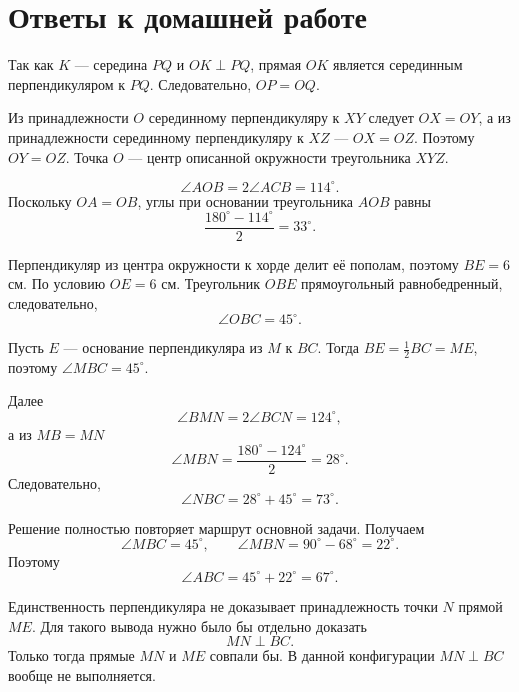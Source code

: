 \newpage
\section{Ответы к домашней работе}

\begin{answerbox}[Задание 1]
Так как \(K\) — середина \(PQ\) и \(OK\perp PQ\), прямая \(OK\) является
серединным перпендикуляром к \(PQ\). Следовательно, \(OP=OQ\).
\end{answerbox}

\begin{answerbox}[Задание 2]
Из принадлежности \(O\) серединному перпендикуляру к \(XY\) следует
\(OX=OY\), а из принадлежности серединному перпендикуляру к \(XZ\) —
\(OX=OZ\). Поэтому \(OY=OZ\). Точка \(O\) — центр описанной окружности
треугольника \(XYZ\).
\end{answerbox}

\begin{answerbox}[Задание 3]
\[
\angle AOB=2\angle ACB=114^\circ.
\]
Поскольку \(OA=OB\), углы при основании треугольника \(AOB\) равны
\[
\frac{180^\circ-114^\circ}{2}=33^\circ.
\]
\end{answerbox}

\begin{answerbox}[Задание 4]
Перпендикуляр из центра окружности к хорде делит её пополам, поэтому
\(BE=6\) см. По условию \(OE=6\) см. Треугольник \(OBE\) прямоугольный
равнобедренный, следовательно,
\[
\angle OBC=45^\circ.
\]
\end{answerbox}

\begin{answerbox}[Задание 5]
Пусть \(E\) — основание перпендикуляра из \(M\) к \(BC\). Тогда
\(BE=\frac12BC=ME\), поэтому \(\angle MBC=45^\circ\).

Далее
\[
\angle BMN=2\angle BCN=124^\circ,
\]
а из \(MB=MN\)
\[
\angle MBN=\frac{180^\circ-124^\circ}{2}=28^\circ.
\]
Следовательно,
\[
\angle NBC=28^\circ+45^\circ=\boxed{73^\circ}.
\]
\end{answerbox}

\begin{answerbox}[Задание 6]
Решение полностью повторяет маршрут основной задачи. Получаем
\[
\angle MBC=45^\circ,
\qquad
\angle MBN=90^\circ-68^\circ=22^\circ.
\]
Поэтому
\[
\angle ABC=45^\circ+22^\circ=\boxed{67^\circ}.
\]
\end{answerbox}

\begin{answerbox}[Задание 7]
Единственность перпендикуляра не доказывает принадлежность точки \(N\)
прямой \(ME\). Для такого вывода нужно было бы отдельно доказать
\[
MN\perp BC.
\]
Только тогда прямые \(MN\) и \(ME\) совпали бы. В данной конфигурации
\(MN\perp BC\) вообще не выполняется.
\end{answerbox}

